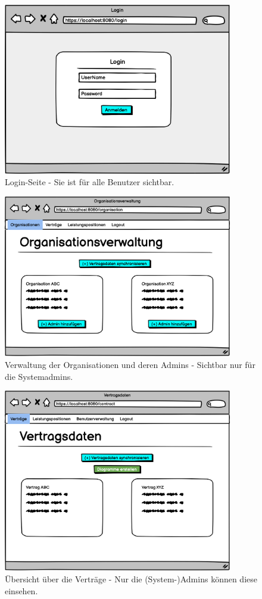 
\begin{figure}[h]
\centering
\includegraphics[width=10cm]{img/mockup_web/login.png}
\caption{Login-Seite - Sie ist für alle Benutzer sichtbar.}
\end{figure}

\begin{figure}[h]
\centering
\includegraphics[width=10cm]{img/mockup_web/system-admin-orgs.png}
\caption{Verwaltung der Organisationen und deren Admins - Sichtbar nur für die Systemadmins.}
\end{figure}

\begin{figure}[h]
\centering
\includegraphics[width=10cm]{img/mockup_web/admin-vertraege.png}
\caption{Übersicht über die Verträge - Nur die (System-)Admins können diese einsehen.}
\end{figure}

